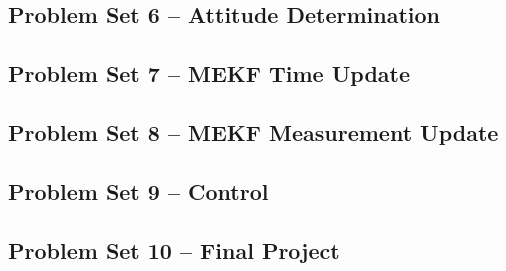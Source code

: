 \newpage
\subsection{Problem Set 6 – Attitude Determination}






\newpage
\subsection{Problem Set 7 – MEKF Time Update}


\newpage
\subsection{Problem Set 8 – MEKF Measurement Update}




\newpage
\subsection{Problem Set 9 – Control}




\newpage
\subsection{Problem Set 10 – Final Project}

